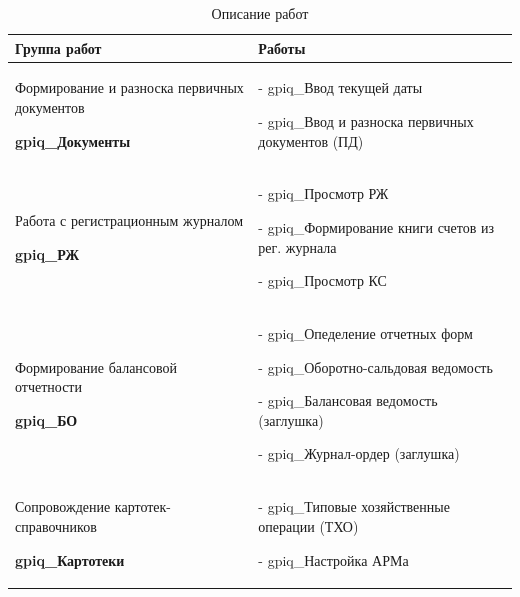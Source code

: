 \begin{table}[h!p]
    \centering
    \scriptsize
    \caption{Описание работ}
    \begin{tabular}{|p{8cm}|p{8cm}|} 


\hline


\textbf{Группа работ}
&
\textbf{Работы}
\\ \hline


Формирование и разноска первичных документов \par
\hspace{0pt} \par
\textbf{gpiq\_Документы}
&
- gpiq\_Ввод текущей даты \par
- gpiq\_Ввод и разноска первичных документов (ПД)
\\ \hline


Работа с регистрационным журналом \par
\hspace{0pt} \par
\textbf{gpiq\_РЖ}
&
- gpiq\_Просмотр РЖ \par
- gpiq\_Формирование книги счетов из рег. журнала \par
- gpiq\_Просмотр КС
\\ \hline


Формирование балансовой отчетности \par
\hspace{0pt} \par
\textbf{gpiq\_БО}
&
- gpiq\_Опеделение отчетных форм \par
- gpiq\_Оборотно-сальдовая ведомость  \par
- gpiq\_Балансовая ведомость (заглушка) \par
- gpiq\_Журнал-ордер (заглушка)
\\ \hline


Сопровождение картотек-справочников \par
\hspace{0pt} \par
\textbf{gpiq\_Картотеки}
&
- gpiq\_Типовые хозяйственные операции (ТХО) \par
- gpiq\_Настройка АРМа
\\ \hline


\end{tabular}
\end{table}
